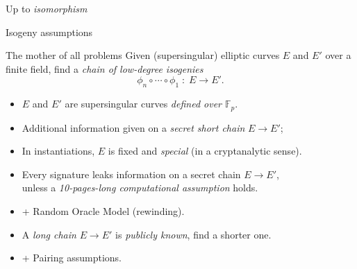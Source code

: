 \documentclass[aspectratio=169]{beamer}
\newcommand{\F}{\mathbb{F}}
\begin{document}
\begin{frame}{Up to \emph{isomorphism}}
\begin{center}
  \end{center}  
\end{frame}


\begin{frame}{Isogeny assumptions}
  \begin{block}{The mother of all problems}
    Given (supersingular) elliptic curves \emph{$E$} and \emph{$E'$}
    over a finite field, find a \emph{chain of low-degree isogenies}
    \[\phi_n\circ\cdots\circ\phi_1 \;:\; E\to E'.\]
  \end{block}

  \begin{description}[leftmargin=1em]
    \setlength{\itemsep}{1em}
  \item[CSIDH/CSI-FiSh]
    \begin{itemize}
    \item $E$ and $E'$ are supersingular curves \emph{defined over $\F_p$}.
    \end{itemize}
  \item[SIDH/SIKE] 
    \begin{itemize}
    \item Additional information given on a \emph{secret short
        chain} $E\to E'$;
    \item In instantiations, $E$ is fixed and \emph{special} (in a
      cryptanalytic sense).
    \end{itemize}
  \item[SQISign]
    \begin{itemize}
    \item Every signature leaks information on a secret chain
      $E\to E'$,\\ unless a \emph{10-pages-long computational
        assumption} holds.
    \item + Random Oracle Model (rewinding).
    \end{itemize}
  \item[Time-delay]
    \begin{itemize}
    \item A \emph{long chain} $E\to E'$ is \emph{publicly known}, find
      a shorter one.
    \item + Pairing assumptions.
    \end{itemize}
  \end{description}
\end{frame}
\end{document}
